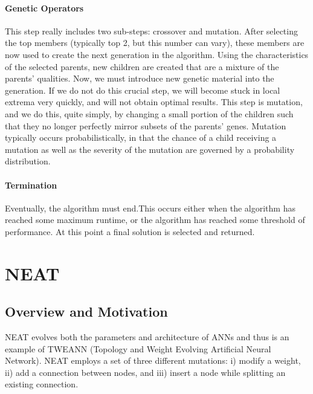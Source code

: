 \documentclass[journal, a4paper]{IEEEtran}
\begin{document}
\paragraph{Genetic Operators}
This step really includes two sub-steps: crossover and mutation. After selecting the top members (typically top 2, but this number can vary), these members are now used to create the next generation in the algorithm. Using the characteristics of the selected parents, new children are created that are a mixture of the parents’ qualities. 
Now, we must introduce new genetic material into the generation. If we do not do this crucial step, we will become stuck in local extrema very quickly, and will not obtain optimal results. This step is mutation, and we do this, quite simply, by changing a small portion of the children such that they no longer perfectly mirror subsets of the parents’ genes. Mutation typically occurs probabilistically, in that the chance of a child receiving a mutation as well as the severity of the mutation are governed by a probability distribution. \cite{cite04}

\paragraph{Termination}
Eventually, the algorithm must end.This occurs either when the algorithm has reached some maximum runtime, or the algorithm has reached some threshold of performance. At this point a final solution is selected and returned. \cite{cite04}





\section{NEAT}

\subsection{Overview and Motivation}

NEAT evolves both the parameters and architecture of ANNs and thus is an example of TWEANN (Topology and Weight Evolving Artificial Neural Network). NEAT employs a set of three different mutations: i) modify a weight, ii) add a connection between nodes, and iii) insert a node while splitting an existing connection. \cite{cite05}
\end{document}
